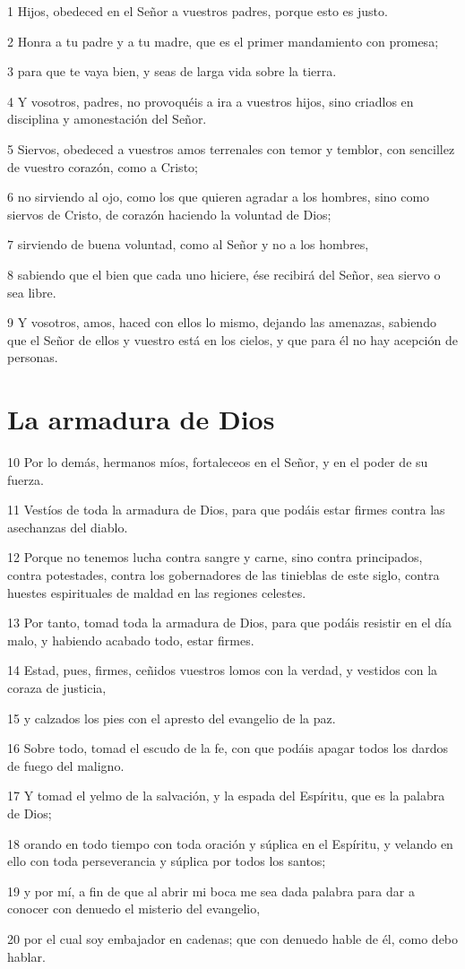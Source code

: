 \par 1 Hijos, obedeced en el Señor a vuestros padres, porque esto es justo.
\par 2 Honra a tu padre y a tu madre, que es el primer mandamiento con promesa;
\par 3 para que te vaya bien, y seas de larga vida sobre la tierra.
\par 4 Y vosotros, padres, no provoquéis a ira a vuestros hijos, sino criadlos en disciplina y amonestación del Señor.
\par 5 Siervos, obedeced a vuestros amos terrenales con temor y temblor, con sencillez de vuestro corazón, como a Cristo;
\par 6 no sirviendo al ojo, como los que quieren agradar a los hombres, sino como siervos de Cristo, de corazón haciendo la voluntad de Dios;
\par 7 sirviendo de buena voluntad, como al Señor y no a los hombres,
\par 8 sabiendo que el bien que cada uno hiciere, ése recibirá del Señor, sea siervo o sea libre.
\par 9 Y vosotros, amos, haced con ellos lo mismo, dejando las amenazas, sabiendo que el Señor de ellos y vuestro está en los cielos, y que para él no hay acepción de personas.

\section*{La armadura de Dios}

\par 10 Por lo demás, hermanos míos, fortaleceos en el Señor, y en el poder de su fuerza.
\par 11 Vestíos de toda la armadura de Dios, para que podáis estar firmes contra las asechanzas del diablo.
\par 12 Porque no tenemos lucha contra sangre y carne, sino contra principados, contra potestades, contra los gobernadores de las tinieblas de este siglo, contra huestes espirituales de maldad en las regiones celestes.
\par 13 Por tanto, tomad toda la armadura de Dios, para que podáis resistir en el día malo, y habiendo acabado todo, estar firmes.
\par 14 Estad, pues, firmes, ceñidos vuestros lomos con la verdad, y vestidos con la coraza de justicia,
\par 15 y calzados los pies con el apresto del evangelio de la paz.
\par 16 Sobre todo, tomad el escudo de la fe, con que podáis apagar todos los dardos de fuego del maligno.
\par 17 Y tomad el yelmo de la salvación, y la espada del Espíritu, que es la palabra de Dios;
\par 18 orando en todo tiempo con toda oración y súplica en el Espíritu, y velando en ello con toda perseverancia y súplica por todos los santos;
\par 19 y por mí, a fin de que al abrir mi boca me sea dada palabra para dar a conocer con denuedo el misterio del evangelio,
\par 20 por el cual soy embajador en cadenas; que con denuedo hable de él, como debo hablar.

